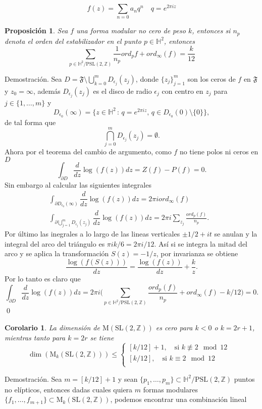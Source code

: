 \documentclass[letterpaper]{article}
\newtheorem{prop}[teorema]{Proposici\'on}
\newtheorem{cor}[teorema]{Corolario}
\newcommand{\dem}{{\noindent \sc Demostraci\'on. }}
\newcommand{\pslz}{\ensuremath{\mathrm{PSL}(2,\mathbb Z) }}
\newcommand{\hd}{\ensuremath{\mathbb H^2}}
\newcommand{\slz}{\ensuremath{\mathrm{SL}(2,\mathbb Z) }}
\newcommand{\mdlr}{\ensuremath{\mathrm{M}}}
\begin{document}
\[
    f(z)=\sum_{n=0}a_nq^n\quad q=e^{2\pi iz}
\]
\begin{prop}\label{mod-cero}
Sea $f$ una forma modular no cero de peso $k$, entonces si $n_p$ denota el orden del estabilizador en el punto \(p\in\hd\), entonces
\begin{equation}\label{mod-dim}
\sum_{p\in\hd/\pslz}\frac{1}{n_p}ord_p{f}+ord_{\infty}(f)=\frac{k}{12}
\end{equation}
\end{prop}
\dem Sea \(D=\mathfrak{F}\setminus\bigcup_{k=0}^{m}D_{\epsilon_j}(z_j)\), donde \(\{z_j\}_{j=1}^m\) son los ceros de \(f\) en \(\mathfrak{F}\) y \(z_0=\infty\), además \(D_{\epsilon_{j}}(z_j)\) es el disco de radio \(\epsilon_j\) con centro en \(z_j\) para \(j\in\{1,\dots,m\}\) y
\[
    D_{\epsilon_0}(\infty)=\{z\in\hd\,:\,q=e^{2\pi iz},\,q\in D_{\epsilon_0}(0)\setminus\{0\}\},
\]
de tal forma que
\[
    \bigcap_{j=0}^{m} D_{\epsilon_j}(z_j)=\emptyset.
\]
Ahora por el teorema del cambio de argumento, como \(f\) no tiene polos ni ceros en \(D\)
\[
    \int_{\partial D}\dfrac{d}{dz}\log(f(z))dz=Z(f)-P(f)=0.
\]
Sin embargo al calcular las siguientes integrales
\begin{align*}
    \int_{\partial D_{\epsilon_0}(\infty)}\dfrac{d}{dz}\log(f(z))dz=2\pi i ord_{\infty}(f)&\\
    \int_{\partial \bigcup_{j=1}^{m} D_{\epsilon_j}(z_j)}\dfrac{d}{dz}\log(f(z))dz=2\pi i\sum_{z_j}\frac{ord_{p}(f)}{n_p}.
\end{align*}
Por último las inegrales a lo largo de las lineas verticales \(\pm1/2+it\) se anulan y la integral del arco del triángulo es \(\pi i k/6=2\pi i/12\). Así si se integra la mitad del arco y se aplica la transformación \(S(z)=-1/z\), por invarianza se obtiene
\[
    \dfrac{\log(f(S(z)))}{dz}=\dfrac{\log(f(z))}{dz}+\frac{k}{z}.
\]
Por lo tanto es claro que
\[
    \int_{\partial D}\dfrac{d}{dz}\log(f(z))dz=2\pi i\Big(\sum_{p\in\hd/\pslz}\frac{ord_p(f)}{n_p}+ord_{\infty}(f)-k/12\Big)=0.
\]
\qed
\begin{cor}
La dimensión de $\mdlr(\slz)$ es cero para $k<0$ o $k=2r+1$, mientras tanto para $k=2r$ se tiene
\[
    \dim(\mdlr_k(\slz))\leq
\begin{cases}
    [k/12]+1,\quad\text{si }k\nequiv 2\mod 12&\\
    [k/12],\quad\text{si }k\equiv 2\mod 12\\
\end{cases}
\]
\end{cor}
\dem Sea \(m=[k/12]+1\) y sean \(\{p_1,\dots,p_m\}\subset\hd/\pslz\) puntos no elípticos, entonces dadas cuales quiera \(m\) formas modulares \(\{f_1,\dots,f_{m+1}\}\subset\mdlr_k(\slz)\), podemos encontrar una combinación lineal
\end{document}
